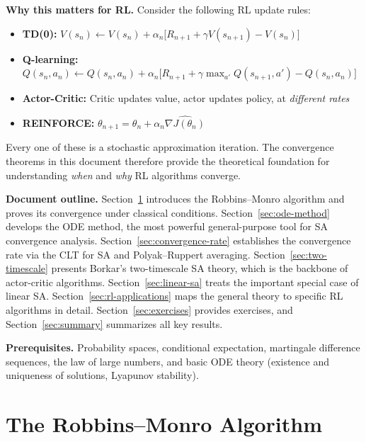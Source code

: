 \documentclass[11pt,a4paper]{article}
\theoremstyle{definition}
\theoremstyle{plain}
\theoremstyle{remark}
\begin{document}
\medskip
\noindent\textbf{Why this matters for RL.} Consider the following RL update rules:
\begin{itemize}[leftmargin=2em]
\item \textbf{TD(0):} $V(s_n) \leftarrow V(s_n) + \alpha_n \bigl[R_{n+1} + \gamma V(s_{n+1}) - V(s_n)\bigr]$
\item \textbf{Q-learning:} $Q(s_n, a_n) \leftarrow Q(s_n,a_n) + \alpha_n \bigl[R_{n+1} + \gamma \max_{a'} Q(s_{n+1},a') - Q(s_n,a_n)\bigr]$
\item \textbf{Actor-Critic:} Critic updates value, actor updates policy, at \emph{different rates}
\item \textbf{REINFORCE:} $\theta_{n+1} = \theta_n + \alpha_n \widehat{\nabla J(\theta_n)}$
\end{itemize}
Every one of these is a stochastic approximation iteration. The convergence theorems
in this document therefore provide the theoretical foundation for understanding
\emph{when} and \emph{why} RL algorithms converge.

\medskip
\noindent\textbf{Document outline.}
Section~\ref{sec:robbins-monro} introduces the Robbins--Monro algorithm and proves its
convergence under classical conditions. Section~\ref{sec:ode-method} develops the ODE
method, the most powerful general-purpose tool for SA convergence analysis.
Section~\ref{sec:convergence-rate} establishes the convergence rate via the CLT for SA
and Polyak--Ruppert averaging. Section~\ref{sec:two-timescale} presents Borkar's
two-timescale SA theory, which is the backbone of actor-critic algorithms.
Section~\ref{sec:linear-sa} treats the important special case of linear SA.
Section~\ref{sec:rl-applications} maps the general theory to specific RL algorithms
in detail. Section~\ref{sec:exercises} provides exercises, and
Section~\ref{sec:summary} summarizes all key results.

\medskip
\noindent\textbf{Prerequisites.} Probability spaces, conditional expectation,
martingale difference sequences, the law of large numbers, and basic ODE theory
(existence and uniqueness of solutions, Lyapunov stability).

\section{The Robbins--Monro Algorithm}
\label{sec:robbins-monro}
\end{document}
